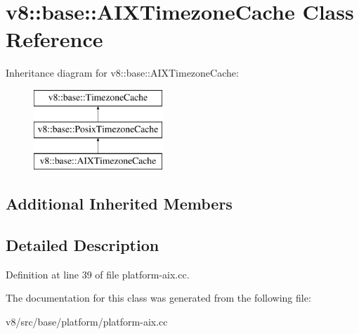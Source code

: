 \hypertarget{classv8_1_1base_1_1AIXTimezoneCache}{}\section{v8\+:\+:base\+:\+:A\+I\+X\+Timezone\+Cache Class Reference}
\label{classv8_1_1base_1_1AIXTimezoneCache}
Inheritance diagram for v8\+:\+:base\+:\+:A\+I\+X\+Timezone\+Cache\+:\begin{figure}[H]
\begin{center}
\leavevmode
\includegraphics[height=3.000000cm]{classv8_1_1base_1_1AIXTimezoneCache}
\end{center}
\end{figure}
\subsection*{Additional Inherited Members}


\subsection{Detailed Description}


Definition at line 39 of file platform-\/aix.\+cc.



The documentation for this class was generated from the following file\+:\begin{DoxyCompactItemize}
\item 
v8/src/base/platform/platform-\/aix.\+cc\end{DoxyCompactItemize}
